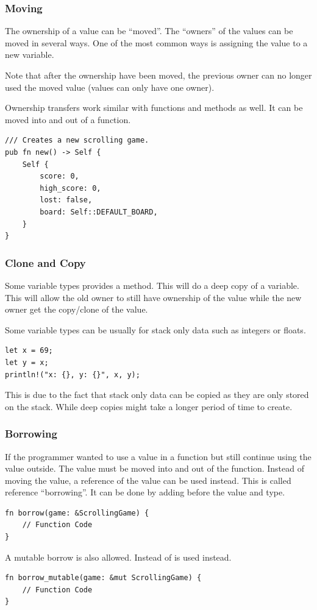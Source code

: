 \documentclass{beamer}
\begin{document}
\begin{frame}
  \frametitle{Moving}
  The ownership of a value can be ``moved''. The ``owners'' of the values can be moved in several ways. One of the most common ways is assigning the value to a new variable.

  

  \alert{Note} that after the ownership have been moved, the previous owner can no longer used the moved value (values can only have one owner).

  \pagebreak

  Ownership transfers work similar with functions and methods as well. It can be moved into and out of a function.
  
  

  \pagebreak
\begin{lstlisting}[caption={Associated function gives ownership.}]
/// Creates a new scrolling game.
pub fn new() -> Self {
    Self {
        score: 0,
        high_score: 0,
        lost: false,
        board: Self::DEFAULT_BOARD,
    }
}
\end{lstlisting}
\end{frame}

\begin{frame}[fragile]
  \frametitle{Clone and Copy}
  Some variable types provides a  method. This will do a deep copy of a variable. This will allow the old owner to still have ownership of the value while the new owner get the copy/clone of the value.

  Some variable types can be  usually for stack only data such as integers or floats.
\begin{lstlisting}
let x = 69;
let y = x;
println!("x: {}, y: {}", x, y);
\end{lstlisting}
  This is due to the fact that stack only data can be copied as they are only stored on the stack. While deep copies might take a longer period of time to create.
\end{frame}

\begin{frame}[fragile]
  \frametitle{Borrowing}
  If the programmer wanted to use a value in a function but still continue using the value outside. The value must be moved into and out of the function. Instead of moving the value, a reference of the value can be used instead. This is called reference ``borrowing''. It can be done by adding \inlinecode{\&} before the value and type.
\begin{lstlisting}
fn borrow(game: &ScrollingGame) {
    // Function Code
}
\end{lstlisting}

  A mutable borrow is also allowed. Instead of \inlinecode{\&}  is used instead.
\begin{lstlisting}
fn borrow_mutable(game: &mut ScrollingGame) {
    // Function Code
}
\end{lstlisting}
\end{frame}
\end{document}

